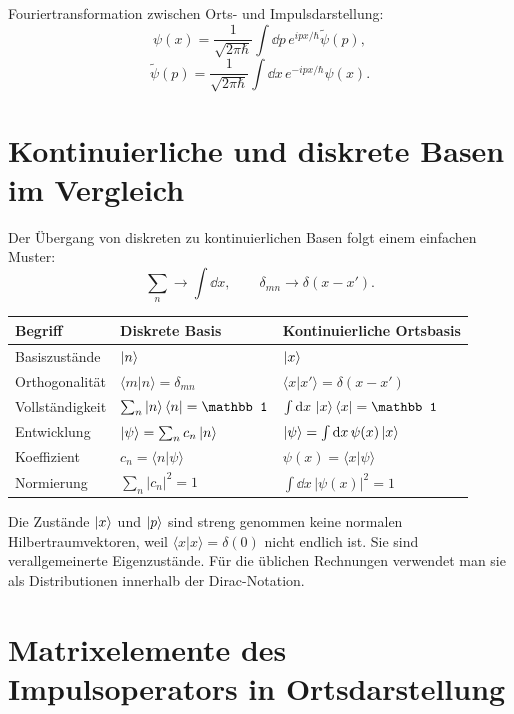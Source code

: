 \begin{formulabox}
Fouriertransformation zwischen Orts- und Impulsdarstellung:
\[
    \psi(x)=\frac{1}{\sqrt{2\pi\hbar}}\int\dd p\,e^{ipx/\hbar}\tilde\psi(p),
\]
\[
    \tilde\psi(p)=\frac{1}{\sqrt{2\pi\hbar}}\int\dd x\,e^{-ipx/\hbar}\psi(x).
\]
\end{formulabox}

\section{Kontinuierliche und diskrete Basen im Vergleich}

Der Übergang von diskreten zu kontinuierlichen Basen folgt einem einfachen Muster:
\[
    \sum_n \longrightarrow \int\dd x,
    \qquad
    \delta_{mn}\longrightarrow\delta(x-x').
\]

\begin{center}
\begin{tabular}{lll}
\toprule
Begriff & Diskrete Basis & Kontinuierliche Ortsbasis \\
\midrule
Basiszustände & $\left|n\right\rangle$ & $\left|x\right\rangle$ \\
Orthogonalität & $\langle m|n\rangle=\delta_{mn}$ & $\langle x|x'\rangle=\delta(x-x')$ \\
Vollständigkeit & $\sum_n\ket n\bra n=\mathbb 1$ & $\int\dd x\,\ket x\bra x=\mathbb 1$ \\
Entwicklung & $\left|\psi\right\rangle=\sum_n c_n\left|n\right\rangle$ & $\left|\psi\right\rangle=\int\mathrm{d} x\,\psi(x)\left|x\right\rangle$ \\
Koeffizient & $c_n=\langle n|\psi\rangle$ & $\psi(x)=\langle x|\psi\rangle$ \\
Normierung & $\sum_n |c_n|^2=1$ & $\int\dd x\,|\psi(x)|^2=1$ \\
\bottomrule
\end{tabular}
\end{center}

\begin{notebox}
Die Zustände $\left|x\right\rangle$ und $\left|p\right\rangle$ sind streng genommen keine normalen Hilbertraumvektoren, weil $\langle x|x\rangle=\delta(0)$ nicht endlich ist. Sie sind verallgemeinerte Eigenzustände. Für die üblichen Rechnungen verwendet man sie als Distributionen innerhalb der Dirac-Notation.
\end{notebox}

\section{Matrixelemente des Impulsoperators in Ortsdarstellung}

